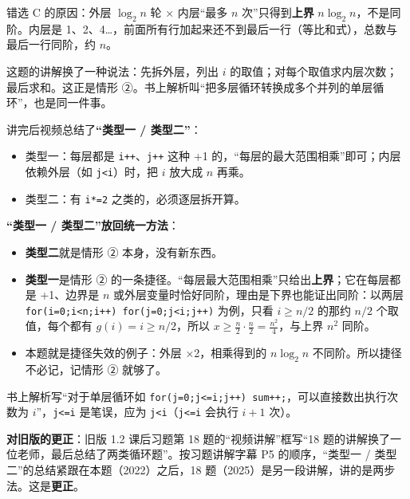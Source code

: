 \documentclass[10.5pt,a4paper,oneside]{article}
\providecommand{\tightlist}{\setlength{\itemsep}{2pt}\setlength{\parskip}{0pt}}
\begin{document}
\begin{pitfallbox}

错选 C 的原因：外层 \(\log_2 n\) 轮 × 内层“最多 \(n\)
次”只得到\textbf{上界} \(n\log_2 n\)，不是同阶。内层是
1、2、4\ldots，前面所有行加起来还不到最后一行（等比和式），总数与最后一行同阶，约
\(n\)。

\end{pitfallbox}

\begin{videobox}

这题的讲解换了一种说法：先拆外层，列出 \(i\)
的取值；对每个取值求内层次数；最后求和。这正是情形
②。书上解析叫“把多层循环转换成多个并列的单层循环”，也是同一件事。

讲完后视频总结了\textbf{“类型一 / 类型二”}：

\begin{itemize}
\tightlist
\item
  类型一：每层都是 \texttt{i++}、\texttt{j++} 这种 +1
  的，“每层的最大范围相乘”即可；内层依赖外层（如
  \texttt{j\textless{}i}）时，把 \(i\) 放大成 \(n\) 再乘。
\item
  类型二：有 \texttt{i*=2} 之类的，必须逐层拆开算。
\end{itemize}

\end{videobox}

\begin{addbox}

\textbf{“类型一 / 类型二”放回统一方法}：

\begin{itemize}
\tightlist
\item
  \textbf{类型二}就是情形 ② 本身，没有新东西。
\item
  \textbf{类型一}是情形 ②
  的一条捷径。“每层最大范围相乘”只给出\textbf{上界}；它在每层都是
  +1、边界是 \(n\) 或外层变量时恰好同阶，理由是下界也能证出同阶：以两层
  \texttt{for(i=0;i\textless{}n;i++)\ for(j=0;j\textless{}i;j++)}
  为例，只看 \(i\ge n/2\) 的那约 \(n/2\) 个取值，每个都有
  \(g(i)=i\ge n/2\)，所以
  \(x\ge\frac n2\cdot\frac n2=\frac{n^2}{4}\)，与上界 \(n^2\) 同阶。
\item
  本题就是捷径失效的例子：外层 ×2，相乘得到的 \(n\log_2 n\)
  不同阶。所以捷径不必记，记情形 ② 就够了。
\end{itemize}

\end{addbox}

\begin{fixbox}

书上解析写“对于单层循环如
\texttt{for(j=0;j\textless{}=i;j++)\ sum++;}，可以直接数出执行次数为
\(i\)”，\texttt{j\textless{}=i} 是笔误，应为
\texttt{j\textless{}i}（\texttt{j\textless{}=i} 会执行 \(i+1\) 次）。

\textbf{对旧版的更正}：旧版 1.2 课后习题第 18 题的“视频讲解”框写“18
题的讲解换了一位老师，最后总结了两类循环题”。按习题讲解字幕 P5
的顺序，“类型一 / 类型二”的总结紧跟在本题（2022）之后，18
题（2025）是另一段讲解，讲的是两步法。这是\textbf{更正}。

\end{fixbox}
\end{document}
